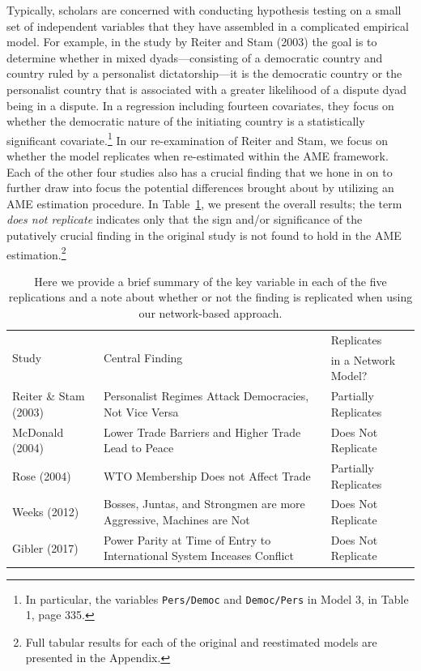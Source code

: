 Typically, scholars are concerned with conducting hypothesis testing on a small set of independent variables that they have assembled in a complicated empirical model. For example, in the study by Reiter and Stam (2003) the goal is to determine whether in mixed dyads---consisting of a democratic country and country ruled by a personalist dictatorship---it is the democratic country or the personalist country that is associated with a greater likelihood of a dispute dyad being in a dispute.  In a regression including fourteen covariates, they focus on whether the democratic nature of the initiating country is a statistically significant covariate.\footnote{In particular, the variables \texttt{Pers/Democ} and \texttt{Democ/Pers} in Model 3, in Table 1, page 335.} In our re-examination of Reiter and Stam, we focus on whether the model replicates when re-estimated within the AME framework. Each of the other four studies also has a crucial finding that we hone in on to further draw into focus the potential differences brought about by utilizing an AME estimation procedure.  In Table~\ref{tab:modelFindingSumm}, we present the overall results; the term \textit{does not replicate} indicates only that the sign and/or significance of the putatively crucial finding in the original study is not found to hold in the AME estimation.\footnote{Full tabular results for each of the original and reestimated models are presented in the Appendix.}

\begin{table}[ht]
\centering
\caption{Here we provide a brief summary of the key variable in each of the five replications and a note about whether or not the finding is replicated when using our network-based approach.}
	\begin{tabular}{l p{7cm} l} \toprule
		\multirow{2}{*}{Study} & \multirow{2}{*}{Central Finding} &  Replicates \\ 
			& &  in a Network Model? \\ \toprule
		Reiter \& Stam (2003) & Personalist Regimes Attack Democracies, Not Vice Versa & {Partially Replicates} \\ \midrule
		McDonald (2004) & Lower Trade Barriers and Higher Trade Lead to Peace & {Does Not Replicate}\\ \midrule
		Rose (2004) & WTO Membership Does not Affect Trade & {Partially Replicates}\\ \midrule
		Weeks (2012) & Bosses, Juntas, and Strongmen are more Aggressive, Machines are Not & {Does Not Replicate} \\\midrule
		Gibler (2017) & Power Parity at Time of Entry to International System Inceases Conflict & {Does Not Replicate}\\ \bottomrule
	\end{tabular}
	\label{tab:modelFindingSumm}
\end{table}

